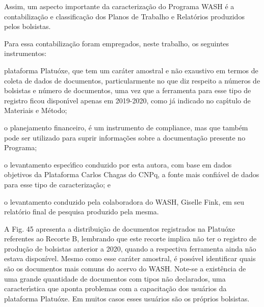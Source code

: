 \documentclass[
12pt,		%
openright,	%
twoside,  %
a4paper,			%
chapter=TITLE,		%
english,			%
french,				%
spanish,			%
brazil				%
]{USPSC-classe/USPSC}
\begin{document}
Assim, um aspecto importante da caracteriza\c{c}\~ao do Programa WASH \'e a contabiliza\c{c}\~ao e classifica\c{c}\~ao dos Planos de Trabalho e Relat\'orios produzidos pelos bolsistas.

















Para essa contabiliza\c{c}\~ao foram empregados, neste trabalho, os seguintes instrumentos:


















\begin{alineas}
\item plataforma Platu\'oxe, que tem um car\'ater amostral e n\~ao exaustivo em termos de coleta de dados de documentos, particularmente no que diz respeito a n\'umeros de bolsistas e n\'umero de documentos, uma vez que a ferramenta para esse tipo de registro ficou dispon\'{\i}vel apenas em 2019-2020, como j\'a indicado no cap\'{\i}tulo de Materiais e M\'etodo;
\item o planejamento financeiro, \'e um instrumento de compliance, mas que tamb\'em pode ser utilizado para suprir informa\c{c}\~oes sobre a documenta\c{c}\~ao presente no Programa;
\item o levantamento espec\'{\i}fico conduzido por esta autora, com base em dados objetivos da Plataforma Carlos Chagas do CNPq, a fonte mais confi\'avel de dados para esse tipo de caracteriza\c{c}\~ao; e
\item o levantamento conduzido pela colaboradora do WASH, Giselle Fink, em seu relat\'orio final de pesquisa produzido pela mesma.
\end{alineas}

A Fig. 45 apresenta a distribui\c{c}\~ao de documentos registrados na Platu\'oxe referentes ao Recorte B, lembrando que este recorte implica n\~ao ter o registro de produ\c{c}\~ao de bolsistas anterior a 2020, quando a respectiva ferramenta ainda n\~ao estava dispon\'{\i}vel. Mesmo como esse car\'ater amostral, \'e poss\'{\i}vel identificar quais s\~ao os documentos mais comuns do acervo do WASH. Note-se a exist\^encia de uma grande quantidade de documentos com tipos n\~ao declarados, uma caracter\'{\i}stica que aponta problemas com a capacita\c{c}\~ao dos usu\'arios da plataforma Platu\'oxe. Em muitos casos esses usu\'arios s\~ao os pr\'oprios bolsistas.
\end{document}
